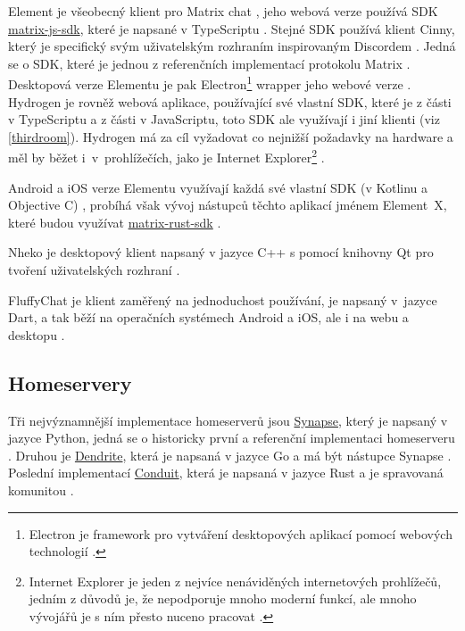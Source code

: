 Element je všeobecný klient pro Matrix chat \cite{Element-Homepage}, jeho webová
verze používá SDK
\href{https://github.com/matrix-org/matrix-js-sdk/}{matrix-js-sdk}, které je
napsané v TypeScriptu \cite{GitHub-MatrixJSSDK}. Stejné SDK používá klient
Cinny, který je specifický svým uživatelským rozhraním inspirovaným Discordem
\cite{Cinny-Homepage,GitHub-Cinny}. Jedná se o SDK, které je jednou z
referenčních implementací protokolu Matrix \cite{GitHub-MatrixJSSDK}. Desktopová
verze Elementu je pak Electron\footnote{
	Electron je framework pro vytváření desktopových aplikací pomocí webových
	technologií \cite{ElectronJS-Homepage}.
} wrapper jeho webové verze \cite{GitHub-ElementDesktop}. Hydrogen je rovněž
webová aplikace, používající své vlastní SDK, které je z části v TypeScriptu a
z části v JavaScriptu, toto SDK ale využívají i jiní klienti (viz
\ref{thirdroom}). Hydrogen má za cíl vyžadovat co nejnižší požadavky na hardware a
měl by běžet i~v~prohlížečích, jako je Internet Explorer\footnote{
	Internet Explorer je jeden z nejvíce nenáviděných internetových prohlížečů,
	jedním z důvodů je, že nepodporuje mnoho moderní funkcí, ale mnoho vývojářů je s
	ním přesto nuceno pracovat
	\cite{ZealousSites-WhyDoWebDevelopersHateInternetExplorer}.
} \cite{GitHub-Hydrogen}.

Android a iOS verze Elementu využívají každá své vlastní SDK (v Kotlinu a
Objective C) \cite{GitHub-ElementAndroid,GitHub-ElementIOS}, probíhá však vývoj
nástupců těchto aplikací jménem Element~X, které budou využívat
\href{https://github.com/matrix-org/matrix-rust-sdk}{matrix-rust-sdk}
\cite{GitHub-ElementXAndroid,GitHub-ElementXIOS}.

Nheko je desktopový klient napsaný v jazyce C++ s pomocí knihovny Qt pro tvoření
uživatelských rozhraní \cite{GitHub-Nheko}.

FluffyChat je klient zaměřený na jednoduchost používání, je napsaný v~jazyce
Dart, a tak běží na operačních systémech Android a iOS, ale i na webu a
desktopu \cite{FluffyChat-Homepage,GitLab-FluffyChat}.

\subsection{Homeservery}

Tři nejvýznamnější implementace homeserverů jsou
\href{https://github.com/matrix-org/synapse/}{Synapse}, který je napsaný v
jazyce Python, jedná se o historicky první a referenční implementaci homeserveru
\cite{GitHub-Synapse}. Druhou je
\href{https://github.com/matrix-org/dendrite/}{Dendrite}, která je napsaná v
jazyce Go a má být nástupce Synapse \cite{GitHub-Dendrite}. Poslední implementací
\href{https://github.com/timokoesters/conduit}{Conduit}, která je napsaná v
jazyce Rust a je spravovaná komunitou \cite{GitHub-Conduit}.

